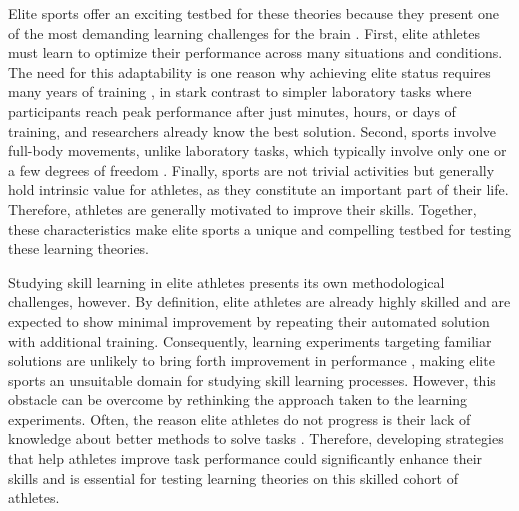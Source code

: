 Elite sports offer an exciting testbed for these theories because they present one of the most demanding learning challenges for the brain \parencite{walsh_is_2014}. First, elite athletes must learn to optimize their performance across many situations and conditions\parencite{mangalam_investigating_2023, du_relationship_2022, krakauer_motor_2019}. The need for this adaptability is one reason why achieving elite status requires many years of training \parencite{krakauer_motor_2019}, in stark contrast to simpler laboratory tasks where participants reach peak performance after just minutes, hours, or days of training, and researchers already know the best solution. Second, sports involve full-body movements, unlike laboratory tasks, which typically involve only one or a few degrees of freedom \parencite{du_relationship_2022}. Finally, sports are not trivial activities but generally hold intrinsic value for athletes, as they constitute an important part of their life. Therefore, athletes are generally motivated to improve their skills. Together, these characteristics make elite sports a unique and compelling testbed for testing these learning theories.

Studying skill learning in elite athletes presents its own methodological challenges, however. By definition, elite athletes are already highly skilled and are expected to show minimal improvement by repeating their automated solution with additional training\parencite{ericsson_development_2003, ericsson_expert_1994, ericsson_scientific_1998}. Consequently, learning experiments targeting familiar solutions are unlikely to bring forth improvement in performance \parencite{thorndike_educational_1913, ericsson_development_2003, grayloooooong, grayshort, ericsson_scientific_1998}, making elite sports an unsuitable domain for studying skill learning processes. However, this obstacle can be overcome by rethinking the approach taken to the learning experiments. Often, the reason elite athletes do not progress is their lack of knowledge about better methods to solve tasks \parencite{grayloooooong, grayshort, thorndike_educational_1913}. Therefore, developing strategies that help athletes improve task performance could significantly enhance their skills and is essential for testing learning theories on this skilled cohort of athletes. 

